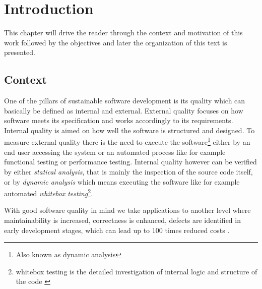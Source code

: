 \chapter{Introduction}
 This chapter will drive the reader through the context and motivation of this work followed by the objectives and later the organization of this text is presented.  
 

\section{Context}

One of the pillars of sustainable software development is its quality which can basically be defined as internal and external. External quality focuses on how software meets its specification and works accordingly to its requirements. Internal quality is aimed on how well the software is structured and designed. To measure external quality there is the need to execute the software\footnote{Also known as dynamic analysis} either by an end user accessing the system or an automated process like for example functional testing or performance testing. Internal quality however can be verified by either \emph{statical analysis}, that is mainly the inspection of the source code itself, or by \emph{dynamic analysis} which means executing the software like for example automated \emph{whitebox testing}\footnote{whitebox testing is the detailed investigation of internal logic and structure of the code \citep{Khan 2012}}.   

With good software quality in mind we take applications to another level where maintainability is increased, correctness is enhanced, defects are identified in early development stages, which can lead up to 100 times reduced costs \citep{Beohm 2001}.

